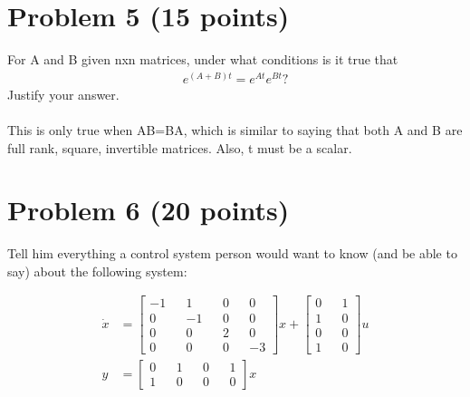 \documentclass[paper=a4,margin, fontsize=11pt]{scrartcl} %
\numberwithin{equation}{section} %
\numberwithin{figure}{section} %
\numberwithin{table}{section} %
\begin{document}
\section*{Problem 5 (15 points)}
For A and B given nxn matrices, under what conditions is it true that
\begin{align*}
e^{(A+B)t}=e^{At}e^{Bt}?
\end{align*}
Justify your answer.\\
\\
This is only true when AB=BA, which is similar to saying that both A and B are full rank, square, invertible matrices.  Also, t must be a scalar.  

\section*{Problem 6 (20 points)}
Tell him everything a control system person would want to know (and be able to say) about the following system:

\begin{align*}
\dot{x}&=\begin{bmatrix} -1 && 1 && 0 && 0\\0 && -1 && 0 && 0\\0 && 0 && 2 && 0\\0 && 0 && 0 && -3\end{bmatrix}x+\begin{bmatrix}0 && 1\\1 && 0\\0 && 0\\1 && 0 \end{bmatrix}u\\
y&=\begin{bmatrix}0 && 1 && 0 && 1\\1 && 0 && 0 &&0\end{bmatrix}x 
\end{align*}
\end{document}

